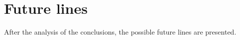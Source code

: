 
\section{Future lines}

After the analysis of the conclusions, the possible future lines are presented. 

